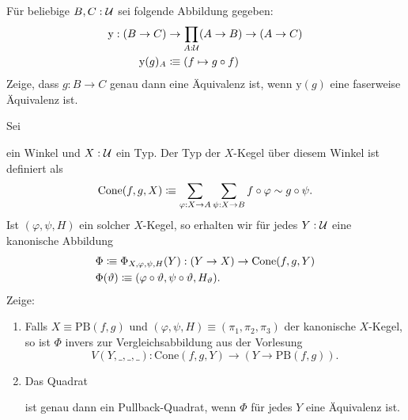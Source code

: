 \documentclass{uebung}
\begin{document}
\begin{exercise}
  Für beliebige $B,C:\mathcal{U}$ sei folgende Abbildung gegeben:
  \begin{align*}
    \mathrm{y}:(B\to C) &\to \prod_{A:\mathcal{U}} (A \to B) \to (A \to C)\\
    \mathrm{y}(g)_A &\vcentcolon\mspace{-1.2mu}\equiv (f \mapsto g\circ f)
  \end{align*}
  Zeige, dass $g:B \to C$ genau dann eine Äquivalenz ist, wenn $\mathrm{y}(g)$ eine faserweise Äquivalenz ist.
\end{exercise}

\begin{bonus}
  Sei
  ein Winkel und $X:\mathcal{U}$ ein Typ.
  Der Typ der $X$-Kegel über diesem Winkel ist definiert als
  $$
  \mathrm{Cone}(f,g,X) \vcentcolon\mspace{-1.2mu}\equiv \sum_{\varphi:X\to A}\sum_{\psi:X\to B} f\circ\varphi \sim g\circ\psi.
  $$
  Ist $(\varphi,\psi,H)$ ein solcher $X$-Kegel, so erhalten wir für jedes $Y:\mathcal{U}$ eine kanonische Abbildung
  \begin{align*}
    &\Phi\vcentcolon\mspace{-1.2mu}\equiv\Phi_{X,\varphi,\psi,H}(Y):(Y \to X) \to \mathrm{Cone}(f,g,Y)\\
    &\Phi(\vartheta)\vcentcolon\mspace{-1.2mu}\equiv (\varphi\circ\vartheta,\psi\circ\vartheta,H_\vartheta).
  \end{align*}
  Zeige:
  \begin{enumerate}
    \item Falls $X\equiv\mathrm{PB}(f,g)$ und $(\varphi,\psi,H)\equiv(\pi_1,\pi_2,\pi_3)$ der kanonische $X$-Kegel, so ist $\Phi$ invers zur Vergleichsabbildung aus der Vorlesung
      $$
      V(Y,\_,\_,\_):\mathrm{Cone}(f,g,Y)\to (Y\to\mathrm{PB}(f,g)).
      $$
    \item Das Quadrat
      \begin{center}
      \end{center}
      ist genau dann ein Pullback-Quadrat, wenn $\Phi$ für jedes $Y$ eine Äquivalenz ist.
  \end{enumerate}
\end{bonus}
\end{document}
